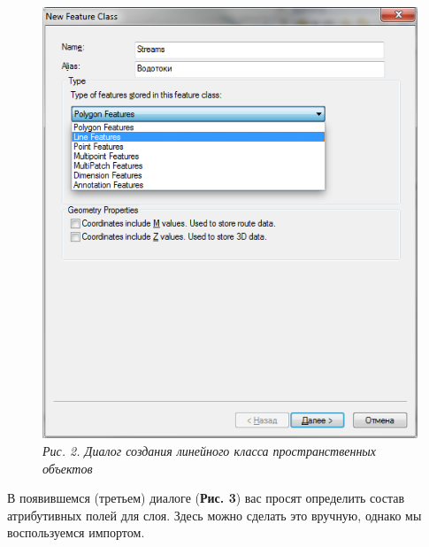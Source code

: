 \documentclass[12pt,]{book}
\begin{document}
\begin{enumerate}
  \begin{figure}
  \centering
  \includegraphics{images/Ex13/image8.png}
  \caption{\emph{Рис. 2. Диалог создания линейного класса пространственных объектов}}
  \end{figure}

  В появившемся (третьем) диалоге (\textbf{Рис. 3}) вас просят определить состав атрибутивных полей для слоя. Здесь можно сделать это вручную, однако мы воспользуемся импортом.


\end{enumerate}
\end{document}
